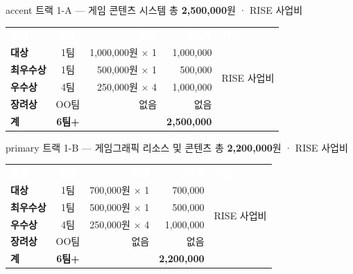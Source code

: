 \documentclass[11pt, a4paper]{article}
\begin{document}
\begin{trackheader}{accent}
  트랙 1-A \;—\; 게임 콘텐츠 시스템 \hfill
  {\normalfont\small 총 \textbf{2,500,000}원 \;·\; RISE 사업비}
\end{trackheader}
\vspace{-4pt}
\begin{infocard}[colframe=accent!30]
\renewcommand{\arraystretch}{1.4}
\begin{tabularx}{\textwidth}{@{}l c r r l@{}}
  \rowcolor{tabhead}
  \textcolor{white}{\textsf{\bfseries 등급}} &
  \textcolor{white}{\textsf{\bfseries 팀수}} &
  \textcolor{white}{\textsf{\bfseries 상금}} &
  \textcolor{white}{\textsf{\bfseries 상금계}} &
  \textcolor{white}{\textsf{\bfseries 재원}} \\
  \textbf{대상}     & 1팀  & 1,000,000원 $\times$ 1 & 1,000,000
    & \multirow{4}{*}{\small RISE 사업비} \\
  \rowcolor{tabrow}
  \textbf{최우수상} & 1팀  & 500,000원 $\times$ 1   & 500,000   & \\
  \textbf{우수상}   & 4팀  & 250,000원 $\times$ 4   & 1,000,000 & \\
  \rowcolor{tabrow}
  \textbf{장려상}   & OO팀 & 없음                    & 없음      & \\
  \arrayrulecolor{lightborder}\midrule
  \textbf{계} & \textbf{6팀+} & & \textbf{2,500,000} & \\
\end{tabularx}
\end{infocard}

\vspace{8pt}

\begin{trackheader}{primary}
  트랙 1-B \;—\; 게임그래픽 리소스 및 콘텐츠 \hfill
  {\normalfont\small 총 \textbf{2,200,000}원 \;·\; RISE 사업비}
\end{trackheader}
\vspace{-4pt}
\begin{infocard}[colframe=primary!30]
\renewcommand{\arraystretch}{1.4}
\begin{tabularx}{\textwidth}{@{}l c r r l@{}}
  \rowcolor{tabhead}
  \textcolor{white}{\textsf{\bfseries 등급}} &
  \textcolor{white}{\textsf{\bfseries 팀수}} &
  \textcolor{white}{\textsf{\bfseries 상금}} &
  \textcolor{white}{\textsf{\bfseries 상금계}} &
  \textcolor{white}{\textsf{\bfseries 재원}} \\
  \textbf{대상}     & 1팀  & 700,000원 $\times$ 1 & 700,000
    & \multirow{4}{*}{\small RISE 사업비} \\
  \rowcolor{tabrow}
  \textbf{최우수상} & 1팀  & 500,000원 $\times$ 1 & 500,000   & \\
  \textbf{우수상}   & 4팀  & 250,000원 $\times$ 4 & 1,000,000 & \\
  \rowcolor{tabrow}
  \textbf{장려상}   & OO팀 & 없음                  & 없음      & \\
  \arrayrulecolor{lightborder}\midrule
  \textbf{계} & \textbf{6팀+} & & \textbf{2,200,000} & \\
\end{tabularx}
\end{infocard}
\end{document}
